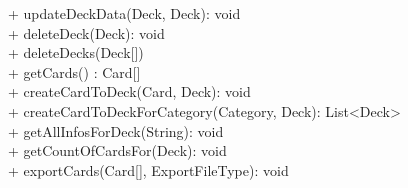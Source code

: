 { 
    + updateDeckData(Deck, Deck): void \\ 
    + deleteDeck(Deck): void \\ 
    + deleteDecks(Deck[]) \\ 
    + getCards() : Card[]\\
    + createCardToDeck(Card, Deck): void \\
    + createCardToDeckForCategory(Category, Deck): List<Deck>\\
    + getAllInfosForDeck(String): void\\
    + getCountOfCardsFor(Deck): void\\
    + exportCards(Card[], ExportFileType): void
}{}
